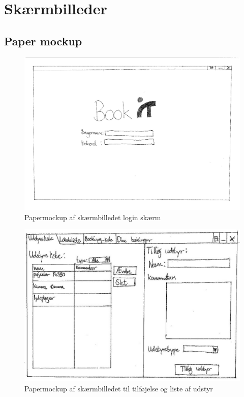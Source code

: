 \chapter{Skærmbilleder}
\label{App_GUI}

\minilof
\clearpage
\section{Paper mockup}
\label{App_GUI_paper}

\begin{figure}[h!]
  \centering
    \includegraphics[angle=90, height=0.75\textheight]{Appendix/GUI-Prototype/PaperMockup/LogIn_001}
  \caption{Papermockup af skærmbilledet login skærm}
\label{App_GUI_paper_LogIn}
\end{figure}

\begin{figure}[h!]
  \centering
    \includegraphics[angle=90, height=0.9\textheight]{Appendix/GUI-Prototype/PaperMockup/UdstyrsListe}
  \caption{Papermockup af skærmbilledet til tilføjelse og liste af udstyr}
\label{App_GUI_paper_UdstyrsListe}
\end{figure}

